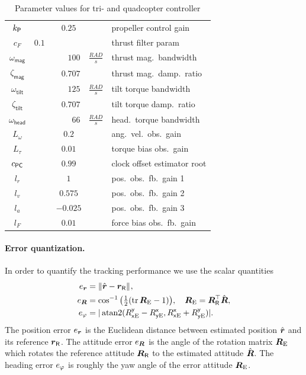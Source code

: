 \begin{table}
\begin{tabular}{crlrll}
  $k_{\mathsf{P}}$  & \multicolumn{4}{c}{$0.25$} & propeller control gain \\
  $c_F$ & $0.1$& & & & thrust filter param \\
  $\omega_{\mathsf{mag}}$ & & & $100$&$\tfrac{\unit{RAD}}{\unit{s}}$ & thrust mag.\ bandwidth \\
  $\zeta_{\mathsf{mag}}$ & & & $0.707$& & thrust mag.\ damp.\ ratio \\
  $\omega_{\mathsf{tilt}}$ & & & $125$&$\tfrac{\unit{RAD}}{\unit{s}}$ & tilt torque bandwidth \\
  $\zeta_{\mathsf{tilt}}$ & & & $0.707$& & tilt torque damp.\ ratio \\
  $\omega_{\mathsf{head}}$ & & & $66$&$\tfrac{\unit{RAD}}{\unit{s}}$ & head.\ torque bandwidth \\
  \midrule
  $L_\omega$  & \multicolumn{4}{c}{$0.2$} & ang.\ vel.\ obs.\ gain \\
  $L_\tau$  & \multicolumn{4}{c}{$0.01$} & torque bias obs.\ gain \\
  $c_{\mathsf{PC}}$  & \multicolumn{4}{c}{$0.99$} & clock offset estimator root \\
  $l_r$  & \multicolumn{4}{c}{$1$} & pos.\ obs.\ fb.\ gain 1 \\
  $l_v$  & \multicolumn{4}{c}{$0.575$} & pos.\ obs.\ fb.\ gain 2 \\
  $l_a$  & \multicolumn{4}{c}{$-0.025$} & pos.\ obs.\ fb.\ gain 3 \\
  $l_F$  & \multicolumn{4}{c}{$0.01$} & force bias obs.\ fb.\ gain \\
  \bottomrule
 \end{tabular}
 \caption{Parameter values for tri- and quadcopter controller}
 \label{tab:ParamTriQuadCtrl}
\end{table}


\paragraph{Error quantization.}
In order to quantify the tracking performance we use the scalar quantities 
\begin{subequations}
\begin{align}
 e_{\boldsymbol{r}} &= \| \hat{\boldsymbol{r}} - \boldsymbol{r}_{\mathsf{R}} \|_{},
\\
 e_{\boldsymbol{R}} &= \cos^{-1} \big( \tfrac{1}{2} (\operatorname{tr}\boldsymbol{R}_{\mathrm{E}} - 1) \big), \quad \boldsymbol{R}_{\mathrm{E}} = \boldsymbol{R}_{\mathsf{R}}^\top \hat{\boldsymbol{R}},
\\
 e_{\varphi} &= |\operatorname{atan2}(R^{\mathsf{y}}_{\mathsf{x}\mathrm{E}} - R^{\mathsf{x}}_{\mathsf{y}\mathrm{E}}, R^{\mathsf{x}}_{\mathsf{x}\mathrm{E}} + R^{\mathsf{y}}_{\mathsf{y}\mathrm{E}})|.
\end{align} 
\end{subequations}
The position error $e_{\boldsymbol{r}}$ is the Euclidean distance between estimated position $\hat{\boldsymbol{r}}$ and its reference $\boldsymbol{r}_{\mathsf{R}}$.
The attitude error $e_{\boldsymbol{R}}$ is the angle of the rotation matrix $\boldsymbol{R}_{\mathrm{E}}$ which rotates the reference attitude $\boldsymbol{R}_{\mathsf{R}}$ to the estimated attitude $\hat{\boldsymbol{R}}$.
The heading error $e_{\varphi}$ is roughly the yaw angle of the error attitude $\boldsymbol{R}_{\mathrm{E}}$.

